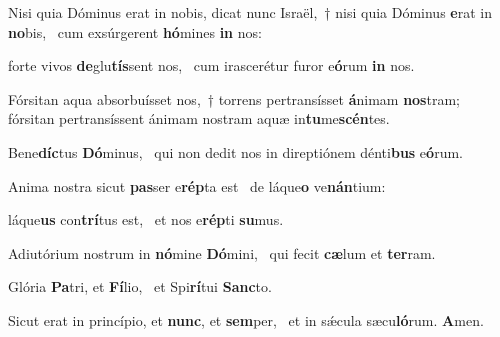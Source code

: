\item Nisi quia Dóminus erat in nobis, dicat nunc Israël,~† nisi quia Dóminus \textbf{e}rat in \textbf{no}bis,~\psstar{} cum exsúrgerent \textbf{hó}mines \textbf{in} nos:

\item forte vivos \textbf{de}glu\textbf{tís}sent nos,~\psstar{} cum irascerétur furor e\textbf{ó}rum \textbf{in} nos.

\item Fórsitan aqua absorbuísset nos,~† torrens pertransísset \textbf{á}nimam \textbf{nos}tram;~\psstar{} fórsitan pertransíssent ánimam nostram aquæ in\textbf{tu}me\textbf{scén}tes.

\item Bene\textbf{díc}tus \textbf{Dó}minus,~\psstar{} qui non dedit nos in direptiónem dénti\textbf{bus} e\textbf{ó}rum.

\item Anima nostra sicut \textbf{pas}ser e\textbf{rép}ta est~\psstar{} de láque\textbf{o} ve\textbf{nán}tium:

\item láque\textbf{us} con\textbf{trí}tus est,~\psstar{} et nos e\textbf{rép}ti \textbf{su}mus.

\item Adiutórium nostrum in \textbf{nó}mine \textbf{Dó}mini,~\psstar{} qui fecit \textbf{cæ}lum et \textbf{ter}ram.

\item Glória \textbf{Pa}tri, et \textbf{Fí}lio,~\psstar{} et Spi\textbf{rí}tui \textbf{Sanc}to.

\item Sicut erat in princípio, et \textbf{nunc}, et \textbf{sem}per,~\psstar{} et in sǽcula sæcu\textbf{ló}rum. \textbf{A}men.